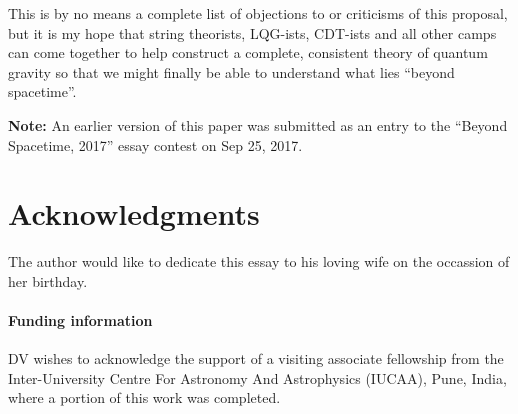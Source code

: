 \documentclass[submission, Phys]{SciPost}
\begin{document}
This is by no means a complete list of objections to or criticisms of this proposal, but it is my hope that string theorists, LQG-ists, CDT-ists and all other camps can come together to help construct a complete, consistent theory of quantum gravity so that we might finally be able to understand what lies ``beyond spacetime''.

\textbf{Note:} An earlier version of this paper was submitted as an entry to the ``Beyond Spacetime, 2017'' essay contest on Sep 25, 2017.

\section*{Acknowledgments}

The author would like to dedicate this essay to his loving wife on the occassion of her birthday.

\paragraph{Funding information}

DV wishes to acknowledge the support of a visiting associate fellowship from the Inter-University Centre For Astronomy And Astrophysics (IUCAA), Pune, India, where a portion of this work was completed.

%
%
%
%
\end{document}
